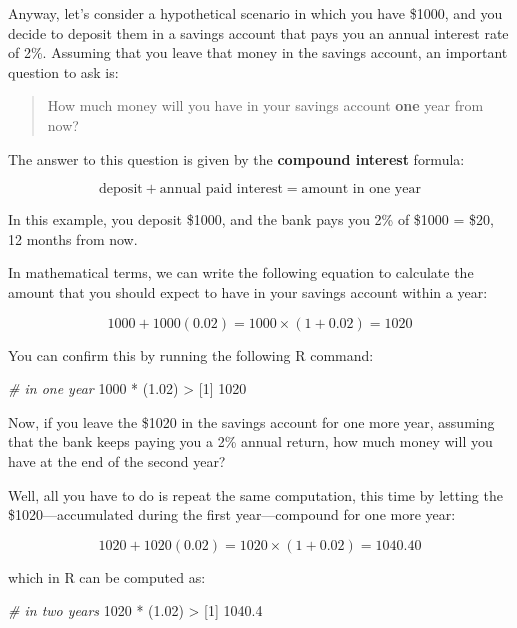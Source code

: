 \documentclass[
]{book}
\newenvironment{Shaded}{\begin{snugshade}}{\end{snugshade}}
\newcommand{\CommentTok}[1]{\textcolor[rgb]{0.56,0.35,0.01}{\textit{#1}}}
\newcommand{\DecValTok}[1]{\textcolor[rgb]{0.00,0.00,0.81}{#1}}
\newcommand{\FloatTok}[1]{\textcolor[rgb]{0.00,0.00,0.81}{#1}}
\newcommand{\NormalTok}[1]{#1}
\newcommand{\SpecialCharTok}[1]{\textcolor[rgb]{0.00,0.00,0.00}{#1}}
\begin{document}
Anyway, let's consider a hypothetical scenario in which you have \$1000, and
you decide to deposit them in a savings account that pays you an annual
interest rate of 2\%. Assuming that you leave that money in the savings account,
an important question to ask is:

\begin{quote}
How much money will you have in your savings account \textbf{one} year from now?
\end{quote}

The answer to this question is given by the \textbf{compound interest} formula:

\[
\text{deposit} + \text{annual paid interest} = \text{amount in one year}
\]

In this example, you deposit \$1000, and the bank pays you 2\% of \$1000 = \$20,
12 months from now.

In mathematical terms, we can write the following equation to calculate the
amount that you should expect to have in your savings account within a year:

\[
1000 + 1000 (0.02) = 1000 \times (1 + 0.02) = 1020
\]

You can confirm this by running the following R command:

\begin{Shaded}
\begin{Highlighting}[]
\CommentTok{\# in one year}
\DecValTok{1000} \SpecialCharTok{*}\NormalTok{ (}\FloatTok{1.02}\NormalTok{)}
\SpecialCharTok{\textgreater{}}\NormalTok{ [}\DecValTok{1}\NormalTok{] }\DecValTok{1020}
\end{Highlighting}
\end{Shaded}

Now, if you leave the \$1020 in the savings account for one more year, assuming
that the bank keeps paying you a 2\% annual return, how much money will you have
at the end of the second year?

Well, all you have to do is repeat the same computation, this time by letting
the \$1020---accumulated during the first year---compound for one more year:

\[
1020 + 1020 (0.02) = 1020 \times (1 + 0.02) = 1040.40
\]

which in R can be computed as:

\begin{Shaded}
\begin{Highlighting}[]
\CommentTok{\# in two years}
\DecValTok{1020} \SpecialCharTok{*}\NormalTok{ (}\FloatTok{1.02}\NormalTok{)}
\SpecialCharTok{\textgreater{}}\NormalTok{ [}\DecValTok{1}\NormalTok{] }\FloatTok{1040.4}
\end{Highlighting}
\end{Shaded}
\end{document}
